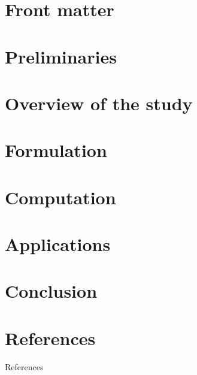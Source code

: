 \documentclass[
    11pt,
    usenames, dvipsnames,
    usepdftitle=false,
    aspectratio=169,
]{beamer}
\begin{document}
\section{Front matter}
\begin{frame}[t]\titlepage\end{frame}   %

\section{Preliminaries}





\section{Overview of the study}


\section{Formulation}




\section{Computation}




\section{Applications}



\section{Conclusion}


\begin{frame} \titlepage \end{frame}

\section{References}
\begin{frame}[t,allowframebreaks]{References}{}
    \printbibliography[heading=none]
\end{frame}
\end{document}
